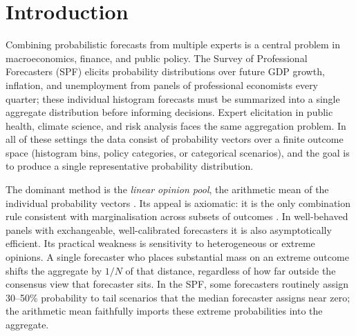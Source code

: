 \section{Introduction}

Combining probabilistic forecasts from multiple experts is a central problem in macroeconomics, finance, and public policy.  The Survey of Professional Forecasters (SPF) elicits probability distributions over future GDP growth, inflation, and unemployment from panels of professional economists every quarter; these individual histogram forecasts must be summarized into a single aggregate distribution before informing decisions.  Expert elicitation in public health, climate science, and risk analysis faces the same aggregation problem.  In all of these settings the data consist of probability vectors over a finite outcome space (histogram bins, policy categories, or categorical scenarios), and the goal is to produce a single representative probability distribution.

The dominant method is the \emph{linear opinion pool}, the arithmetic mean of the individual probability vectors \cite{genest86,ohagan06,timmermann06}.  Its appeal is axiomatic: it is the only combination rule consistent with marginalisation across subsets of outcomes \cite{genest86}.  In well-behaved panels with exchangeable, well-calibrated forecasters it is also asymptotically efficient.  Its practical weakness is sensitivity to heterogeneous or extreme opinions.  A single forecaster who places substantial mass on an extreme outcome shifts the aggregate by $1/N$ of that distance, regardless of how far outside the consensus view that forecaster sits.  In the SPF, some forecasters routinely assign 30--50\% probability to tail scenarios that the median forecaster assigns near zero; the arithmetic mean faithfully imports these extreme probabilities into the aggregate.

